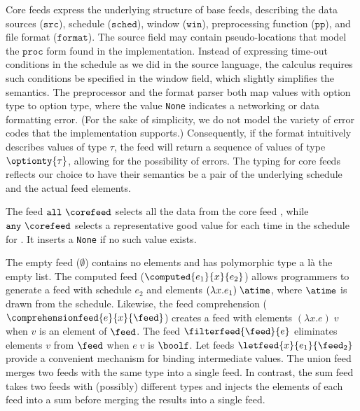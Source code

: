 Core feeds express the underlying structure of base feeds, describing
the data sources ($\mathtt{src}$), schedule ($\mathtt{sched}$), window
($\mathtt{win}$), preprocessing function ($\mathtt{pp}$), and file
format ($\mathtt{format}$).  The source field may contain
pseudo-locations that model the $\mathtt{proc}$ form found in the
implementation.  Instead of expressing time-out conditions in the
schedule as we did in the source language, the calculus requires such
conditions be specified in the window field, which slightly simplifies
the semantics.  The preprocessor and the format parser both map values
with option type to option type, where the value \texttt{None}
indicates a networking or data formatting error. (For the sake of
simplicity, we do not model the variety of error codes that the
implementation supports.)  Consequently, if the format intuitively
describes values of type $\tau$, the feed will return a sequence of
values of type $\optionty{\tau}$, allowing for the possibility of
errors.  The typing for core feeds reflects our choice to have their
semantics be a pair of the underlying schedule and the actual feed
elements.

The feed $\mathtt{all}\ \corefeed$ selects all the data from the core
feed \corefeed, while $\mathtt{any}\ \corefeed$ selects a
representative good value for each time in the schedule for \corefeed{}.
It inserts a \texttt{None} if no such value exists.  


The empty feed ($\emptyset$) contains no elements and has polymorphic
type a l\`a the empty list.  
The computed feed ($\computed{e_1}{x}{e_2}$) allows programmers to
generate a feed with schedule $e_2$ and elements $(\lambda x.e_1)\; \atime$,
where $\atime$ is drawn from the schedule. Likewise, the feed 
comprehension ($\comprehensionfeed{e}{x}{\feed}$) creates a
feed with elements $(\lambda x.e)\; v$ when $v$ is an element of $\feed$.
The feed
$\filterfeed{\feed}{e}$ eliminates elements $v$ from $\feed$ when
$e\; v$ is $\boolf$.  Let feeds $\letfeed{x}{e_1}{\feed_2}$
provide a convenient mechanism for binding intermediate values.
The union feed merges two feeds with the same type
into a single feed.  In contrast, the sum feed takes two feeds
with (possibly) different types and injects the elements of each feed
into a sum before merging the results into a single feed.  

